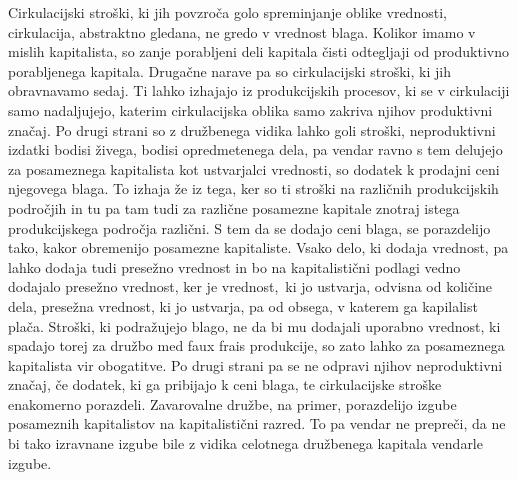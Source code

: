 \documentclass[kapital_02.tex]{subfiles}
\begin{document}
Cirkulacijski stroški, ki jih povzroča golo spreminjanje oblike vrednosti, cirkulacija, abstraktno gledana, ne gredo v vrednost blaga.
Kolikor imamo v mislih kapitalista, so zanje porabljeni deli kapitala čisti odtegljaji od produktivno porabljenega kapitala.
Drugačne narave pa so cirkulacijski stroški, ki jih obravnavamo sedaj.
Ti lahko izhajajo iz produkcijskih procesov, ki se v cirkulaciji samo nadaljujejo, katerim cirkulacijska oblika samo zakriva njihov produktivni značaj.
Po drugi strani so z družbenega vidika lahko goli stroški, neproduktivni izdatki bodisi živega, bodisi opredmetenega dela, pa vendar ravno s tem delujejo za posameznega kapitalista kot ustvarjalci vrednosti, so dodatek k prodajni ceni njegovega blaga.
To izhaja že iz tega, ker so ti stroški na različnih produkcijskih področjih in tu pa tam tudi za različne posamezne kapitale znotraj istega produkcijskega področja različni.
S tem da se dodajo ceni blaga, se porazdelijo tako, kakor obremenijo posamezne kapitaliste.
Vsako delo, ki dodaja vrednost, pa lahko dodaja tudi presežno vrednost in bo na kapitalistični podlagi vedno dodajalo presežno vrednost, ker je vrednost,\KPEstran\ ki jo ustvarja, odvisna od količine dela, presežna vrednost, ki jo ustvarja, pa od obsega, v katerem ga kapilalist plača.
Stroški, ki podražujejo blago, ne da bi mu dodajali uporabno vrednost, ki spadajo torej za družbo med faux frais produkcije, so zato lahko za posameznega kapitalista vir obogatitve.
Po drugi strani pa se ne odpravi njihov neproduktivni značaj, če dodatek, ki ga pribijajo k ceni blaga, te cirkulacijske stroške enakomerno porazdeli.
Zavarovalne družbe, na primer, porazdelijo izgube posameznih kapitalistov na kapitalistični razred.
To pa vendar ne prepreči, da ne bi tako izravnane izgube bile z vidika celotnega družbenega kapitala vendarle izgube.
\end{document}
